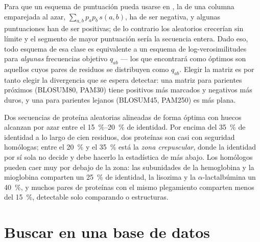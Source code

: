 \begin{proposition}\label{prop:b3:bioinformatics:logodds}
Para que un esquema de puntuación pueda usarse en , la
 de una columna emparejada al azar,
$\sum_{a,b} p_{a} p_{b}\, s(a,b)$, ha de ser negativa, y algunas
puntuaciones han de ser positivas; de lo contrario los 
aleatorios crecerían sin límite y el segmento de mayor puntuación sería
la secuencia entera. Dado eso, todo esquema de esa clase es equivalente a
un esquema de log-verosimilitudes para \emph{algunas} frecuencias
objetivo $q_{ab}$ --- los  que encontrará como óptimos son
aquellos cuyos pares de residuos se distribuyen como $q_{ab}$. Elegir la
matriz es por tanto elegir la divergencia que se espera detectar: una
matriz para parientes próximos (BLOSUM80, PAM30) tiene positivos más
marcados y negativos más duros, y una para parientes lejanos (BLOSUM45,
PAM250) es más plana.
\end{proposition}
\admitted

\begin{example}\label{ex:b3:bioinformatics:twilight}
Dos secuencias de proteína aleatorias alineadas de forma óptima con
huecos alcanzan por azar entre el \qtyrange{15}{20}{\%} de identidad. Por
encima del \qty{35}{\%} de identidad a lo largo de cien residuos, dos
proteínas son casi con seguridad homólogas; entre el \qty{20}{\%} y el
\qty{35}{\%} está la \emph{zona crepuscular}, donde la identidad por sí
sola no decide y debe hacerlo la estadística de más abajo. Los homólogos
pueden caer muy por debajo de la zona: las subunidades de la hemoglobina
y la mioglobina comparten un \qty{25}{\%} de identidad, la lisozima y la
$\alpha$-lactalbúmina un \qty{40}{\%}, y muchos pares de proteínas con el
mismo plegamiento comparten menos del \qty{15}{\%}, detectable solo
comparando  o estructuras.
\end{example}

\section{Buscar en una base de datos}

